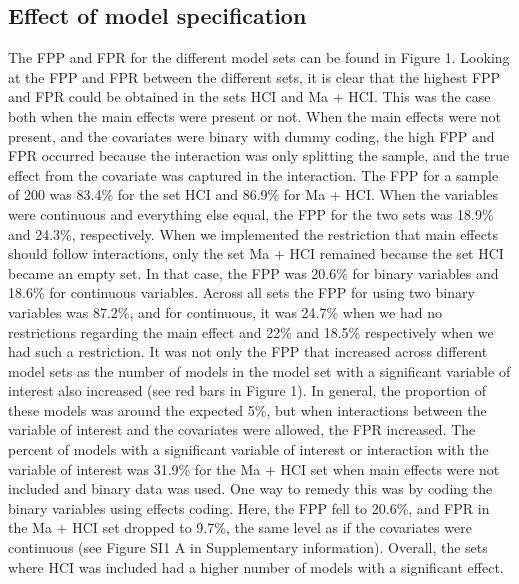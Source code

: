 \subsection{Effect of model specification}
The FPP and FPR for the different model sets can be found in Figure 1. Looking at the FPP and FPR between the different sets, it is clear that the highest FPP and FPR could be obtained in the sets HCI and Ma + HCI. This was the case both when the main effects were present or not. When the main effects were not present, and the covariates were binary with dummy coding, the high FPP and FPR occurred because the interaction was only splitting the sample, and the true effect from the covariate was captured in the interaction. The FPP for a sample of 200 was 83.4\% for the set HCI and 86.9\% for Ma + HCI. When the variables were continuous and everything else equal, the FPP for the two sets was 18.9\% and 24.3\%, respectively. When we implemented the restriction that main effects should follow interactions, only the set Ma + HCI remained because the set HCI became an empty set. In that case, the FPP was 20.6\% for binary variables and 18.6\% for continuous variables. Across all sets the FPP for using two binary variables was 87.2\%, and for continuous, it was 24.7\% when we had no restrictions regarding the main effect and 22\% and 18.5\% respectively when we had such a restriction. 
It was not only the FPP that increased across different model sets as the number of models in the model set with a significant variable of interest also increased (see red bars in Figure 1). In general, the proportion of these models was around the expected 5\%, but when interactions between the variable of interest and the covariates were allowed, the FPR increased. The percent of models with a significant variable of interest or interaction with the variable of interest was 31.9\% for the Ma + HCI set when main effects were not included and binary data was used. One way to remedy this was by coding the binary variables using effects coding. Here, the FPP fell to 20.6\%, and FPR in the Ma + HCI set dropped to 9.7\%, the same level as if the covariates were continuous (see Figure SI1 A in Supplementary information). Overall, the sets where HCI was included had a higher number of models with a significant effect. 
